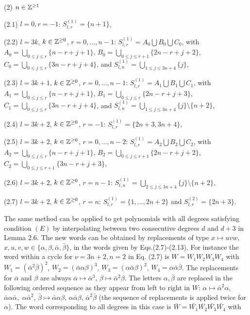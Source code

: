 \documentclass{birkjour_t2}
\theoremstyle{definition}
\theoremstyle{remark}
\numberwithin{equation}{section}
\begin{document}
          (2) $n \in  {\Bbb{Z}}^{\geq 1}$  
          
             (2.1) $l=0, r=-1$: $S^{(1)}_{l, r}=\{n+1\}$,
          
              (2.2) $l=3k$, $k \in  {\Bbb{Z}}^{\geq 0}$, $r=0, \dots, n-1$: $S^{(1)}_{l, r}=A_{0}\bigcup B_{0}\bigcup C_{0}$, with  $A_{0}=\bigcup_{0 \leq j \leq r}  \{n-r+j+1\}$, $B_{0}=\bigcup_{0 \leq j \leq r+1}  \{2n-r+j+2\}$, $C_{0}=\bigcup_{0 \leq j \leq r}  \{3n-r+j+4\}$, and $S^{(1)}_{l, n}=\bigcup_{1 \leq j \leq 3n+4} \{j\}$,
              
              (2.3) $l=3k+1$, $k \in  {\Bbb{Z}}^{\geq 0}$, $r=0, \dots, n-1$: $S^{(1)}_{l, r}=A_{1}\bigcup B_{1}\bigcup C_{1}$, with  $A_{1}=\bigcup_{0 \leq j \leq r}  \{n-r+j+1\}$, $B_{1}=\bigcup_{0 \leq j \leq r}  \{2n-r+j+3\}$, $C_{1}=\bigcup_{0 \leq j \leq r}  \{3n-r+j+4\}$, and $S^{(1)}_{l, n}=\bigcup_{1 \leq j \leq 3n+4} \{j\} \setminus \{n+2\}$,
              
                (2.4) $l=3k+2$, $k \in  {\Bbb{Z}}^{\geq 0}$, $r=-1$:  $S^{(1)}_{l, r} = \{2n+3, 3n+4\}$,  
                
                (2.5) $l=3k+2$, $k \in  {\Bbb{Z}}^{\geq 0}$, $r=0, \dots, n-2$: $S^{(1)}_{l, r}=A_{2}\bigcup B_{2}\bigcup C_{2}$, with $A_{2}=\bigcup_{0 \leq j \leq r} \{n-r+j+1\}$, $B_{2}=\bigcup_{0 \leq j \leq r + 1} \{2 n-r+j + 2\}$, $C_{2}=\bigcup_{0 \leq j \leq r+1} \{3 n-r+j + 3\}$, 
                
                (2.6) $l=3k+2$, $k \in  {\Bbb{Z}}^{\geq 0}$, $r=n-1$:  $S^{(1)}_{l, n}=\bigcup_{2 \leq j \leq 3n+4} \{j\} \setminus \{n+2\}$,
                
                (2.7) $l=3k+2$, $k \in  {\Bbb{Z}}^{\geq 0}$, $r=n$:  $S^{(1)}_{l, r} = \{1, \dots, 2n+2\}$ and  $S^{(2)}_{l, r} =\{2n+3\}$.
 
        \bigskip\par  

The same method can be applied to get polynomials with all degrees satisfying condition $(E)$ by interpolating between two consecutive degrees $d$ and $d+3$ in Lemma 2.6.  The new words can be obtained by replacements of type $x \mapsto uvw$, $x,u,v,w \in \{\alpha, \beta, \bar{\alpha}, \bar{\beta} \}$, in the words given by Eqs.(2.7)-(2.13). For instance the word within a cycle for  $\nu=3n+2, n=2$ in Eq. (2.7) is  $W=W_{1}W_{2}W_{3}W_{4}$ with $W_{1}= (\bar{\alpha}^2\bar{\beta})^2$,  $W_{2}= (\bar{\alpha}\alpha\beta)^3$, $W_{3}= (\alpha\bar{\alpha}\beta)^2$, $W_{4}= \alpha\bar{\alpha}\bar{\beta}$. The replacements for $\bar{\alpha}$ and $\beta$ are always $\bar{\alpha} \mapsto \bar{\alpha}^3$, $\beta \mapsto \bar{\alpha}^2\beta$. The letters $\alpha, \bar{\beta}$ are replaced in the following ordered sequence as they appear from left to right in $W$: $\alpha \mapsto \bar{\alpha}^2\alpha$, $\bar{\alpha}\alpha\bar{\alpha},$ $\alpha\bar{\alpha}^2$,  $\bar{\beta} \mapsto \bar{\alpha}\alpha\beta$, $\alpha\bar{\alpha}\beta$, $\bar{\alpha}^2\bar{\beta}$ (the sequence of replacements is applied twice for $\alpha$). The word corresponding to all degrees in this case is $\bar{W}=\bar{W_{1}}\bar{W_{2}}\bar{W_{3}}\bar{W_{4}}$  with    
\end{document}
